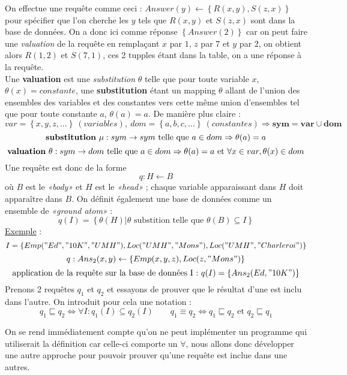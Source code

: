 \documentclass{article}
\begin{document}
On effectue une requête comme ceci : $Answer(y)\leftarrow\left\{R(x,y),S(z,x)\right\}$ pour spécifier que l'on cherche les $y$ tels que $R(x,y)$ et $S(z,x)$ sont dans la base 
de données. On a donc ici comme réponse $\left\{ Answer(2) \right\}$ car on peut faire une \textit{valuation} de la requête en remplaçant $x$ par $1$, $z$ par $7$ et $y$ par 
$2$, on obtient alors $R(1,2)$ et $S(7,1)$, ces 2 tupples étant dans la table, on a une réponse à la requête. \\
Une \textbf{valuation} est une \textit{substitution} $\theta$ telle que pour toute variable $x$, $\theta(x) = constante$, une \textbf{substitution} étant un mapping $\theta$ 
allant de l'union des ensembles des variables et des constantes vers cette même union d'ensembles tel que pour toute constante $a$, $\theta(a) = a$. De manière plus claire :
\[
var = \left\{x,y,z,...\right\}\ (variables),\ dom = \left\{a,b,c,...\right\}\ (constantes) \Rightarrow \boxed{\mathbf{sym = var \cup dom}}
\]
\[
\text{\textbf{substitution} } \mu : sym\rightarrow sym \text{ telle que } a \in dom \Rightarrow \theta(a) = a
\]
\[
\text{\textbf{valuation} } \theta : sym\rightarrow dom \text{ telle que } a \in dom \Rightarrow \theta(a) = a \text{ et } \forall x \in var, \theta(x) \in dom
\]
\newpage
\noindent Une requête est donc de la forme \[\boxed{q:H\leftarrow B}\]
où $B$ est le \textit{«body»} et $H$ est le \textit{«head»} ; chaque variable apparaissant dans $H$ doit apparaître dans $B$. On définit également une base de données comme 
un ensemble de \textit{«ground atom»} :
\[
q(I) = \left\{\theta(H)|\theta \text{ substition telle que } \theta(B)\subseteq I \right\}
\]
\underline{Exemple} :
\[
I = \left\{ Emp("Ed","10K","UMH"), Loc("UMH","Mons"), Loc("UMH","Charleroi") \right\}
\]
\[
q : Ans_2(x,y) \leftarrow \left\{ Emp(x,y,z), Loc(z,"Mons")\right\}
\]
\[
\text{application de la requête sur la base de données I : } q(I) = \left\{Ans_2(Ed,"10K")\right\}
\]
Prenons 2 requêtes $q_1$ et $q_2$ et essayons de prouver que le résultat d'une est inclu dans l'autre. On introduit pour cela une notation : 
\[
\boxed{q_1 \sqsubseteq q_2 \Leftrightarrow \forall I : q_1(I)\subseteq q_2(I)}  \qquad \boxed{q_1 \equiv q_2 \Leftrightarrow q_1 \sqsubseteq q_2\text{ et } q_2 \sqsubseteq 
q_1}
\]

On se rend immédiatement compte qu'on ne peut implémenter un programme qui utiliserait la définition car celle-ci comporte un $\forall$, nous allons donc développer une autre
approche pour pouvoir prouver qu'une requête est inclue dans une autres.
\end{document}
